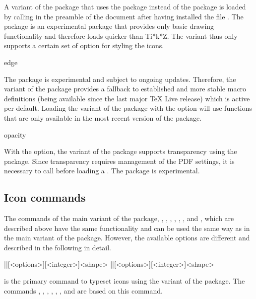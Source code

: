 \documentclass[a4paper]{article}
\begin{document}
A variant of the package that uses the  package instead of the  package is loaded by calling \macro{\usepackage{dndicons-l3draw}} in the preamble of the document after having installed the file . The  package is an experimental package that provides only basic drawing functionality and therefore loads quicker than Ti*k*Z. The  variant thus only supports a certain set of option for styling the icons. 

\begin{macrodef}edge\end{macrodef}
The  package is experimental and subject to ongoing updates. Therefore, the  variant of the  package provides a fallback to established and more stable macro definitions (being available since the last major TeX Live release) which is active per default. Loading the  variant of the package with the option  will use functions that are only available in the most recent version of the  package.

\label{macro:opacity}
\begin{macrodef}opacity\end{macrodef}
With the  option, the  variant of the  package supports transparency using the  package. Since transparency requires management of the PDF settings, it is necessary to call \macro{\DocumentMetadata{}} before loading a \macro{\documentclass}. The  package is experimental.

\subsection{Icon commands}

The commands of the main variant of the  package, \macro{\die}, \macro{\ability}, \macro{\saving}, \macro{\spell}, \macro{\spellschool}, \macro{\damage}, \macro{\attack} and \macro{\condition}, which are described above have the same functionality and can be used the same way as in the main variant of the package. However, the available options are different and described in the following in detail.

\begin{macrodef}
|\DndIconsUseIcon|[<options>][<integer>]{<shape>}
|\DndIconsUseIcon*|[<options>][<integer>]{<shape>}
\end{macrodef}
\macro{\DndIconsUseIcon} is the primary command to typeset icons using the  variant of the package. The commands \macro{\die}, \macro{\ability}, \macro{\saving}, \macro{\spell}, \macro{\spellschool}, \macro{\damage}, \macro{\attack} and \macro{\condition} are based on this command. 
\end{document}
